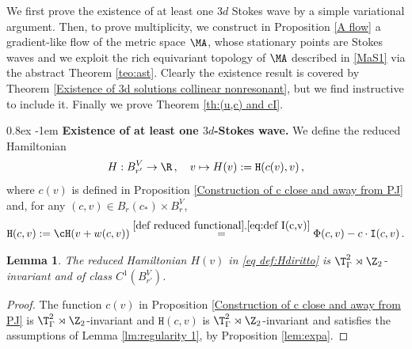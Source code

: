\documentclass[11pt,a4paper,reqno]{article}
\makeatletter
\renewcommand{\paragraph}{%
  \@startsection{paragraph}{4}{\z@}%
  {0.8ex}  %
  {-1em}   %
  {\normalfont\bfseries}%
}
\numberwithin{equation}{section}
\newtheorem{lemma}[theorem]{Lemma}
\theoremstyle{definition}
\makeatother
\begin{document}
We first  prove the existence of at least one $3d$ Stokes wave by a simple variational argument. 
Then, to prove multiplicity,  we 
 construct  in Proposition  \ref{A flow}  a gradient-like flow of the metric space $ \MA $,  whose stationary points 
are  Stokes waves and 
we exploit the rich equivariant topology of $ \MA $  described in \eqref{MaS1} via the  abstract  Theorem \ref{teo:ast}.
Clearly 
the  existence result is  covered by Theorem \ref{Existence of 3d solutions collinear nonresonant}, but we find instructive to include it.
Finally  we 
prove Theorem \ref{th:(u,c) and cI}. 

\paragraph{\bf Existence of at least one $ 3d$-Stokes wave.} %
We define the reduced Hamiltonian
\begin{equation}\label{eq def:Hdiritto}
H:B_{r'}^V\to \R \, , \quad 
 v \mapsto    H(v):= {\mathtt H} (c(v),v)\, ,
\end{equation}
where $c(v)$ is defined in Proposition \ref{Construction of c close and away from PJ} and, for any $ 
    (c,v)\in B_{r}(c_*)\times B_{r}^V $, 
\begin{equation}\label{def:H(c,v)}
\begin{aligned}
    \mathtt{H}(c,v):=\cH(v+w(c,v))
    \stackrel{\eqref{def reduced functional}, \eqref{eq:def I(c,v)}}  = \Phi(c,v)-c\cdot {\mathtt I} (c,v)    \, .
\end{aligned}
\end{equation}
 


\begin{lemma}\label{HisC1}
The reduced Hamiltonian  $H(v)$ in \eqref{eq def:Hdiritto} is $ \T^2_\Gamma \rtimes \Z_2$-invariant and  of class $C^1 (B_{r'}^V)$. 
\end{lemma}

\begin{proof}
The function $c(v)$ in 
Proposition \ref{Construction of c close and away from PJ}  is $\T^2_\Gamma\rtimes \Z_2$-invariant and ${\mathtt H} (c,v) 
$ is $\T^2_\Gamma\rtimes \Z_2$-invariant and 
satisfies the assumptions of Lemma \ref{lm:regularity 1}, by Proposition \ref{lem:expa}.
\end{proof}  

\end{document}
